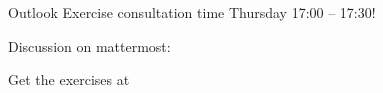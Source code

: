 \begin{frame}{Outlook}{\relax}
	{\Large Exercise consultation time Thursday 17:00 -- 17:30!}

    \bigskip
    Discussion on mattermost: \href{https://mattermost.web.cern.ch/csc/channels/software-design}{}

	\bigskip
	Get the exercises at 

    \bigskip

\end{frame}